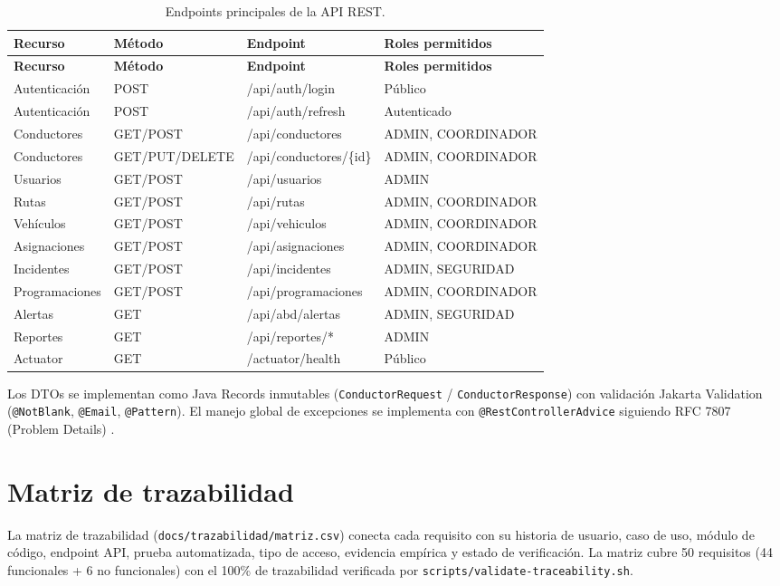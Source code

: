\begin{longtable}{@{}p{3.5cm}p{2cm}p{2.5cm}p{2.5cm}@{}}
\caption{Endpoints principales de la API REST.}
\label{tab:api-rest}\\
\toprule
\textbf{Recurso} & \textbf{Método} & \textbf{Endpoint} & \textbf{Roles permitidos} \\
\midrule
\endfirsthead
\toprule
\textbf{Recurso} & \textbf{Método} & \textbf{Endpoint} & \textbf{Roles permitidos} \\
\midrule
\endhead
Autenticación & POST & /api/auth/login & Público \\
Autenticación & POST & /api/auth/refresh & Autenticado \\
Conductores & GET/POST & /api/conductores & ADMIN, COORDINADOR \\
Conductores & GET/PUT/DELETE & /api/conductores/\{id\} & ADMIN, COORDINADOR \\
Usuarios & GET/POST & /api/usuarios & ADMIN \\
Rutas & GET/POST & /api/rutas & ADMIN, COORDINADOR \\
Vehículos & GET/POST & /api/vehiculos & ADMIN, COORDINADOR \\
Asignaciones & GET/POST & /api/asignaciones & ADMIN, COORDINADOR \\
Incidentes & GET/POST & /api/incidentes & ADMIN, SEGURIDAD \\
Programaciones & GET/POST & /api/programaciones & ADMIN, COORDINADOR \\
Alertas & GET & /api/abd/alertas & ADMIN, SEGURIDAD \\
Reportes & GET & /api/reportes/* & ADMIN \\
Actuator & GET & /actuator/health & Público \\
\bottomrule
\end{longtable}

Los DTOs se implementan como Java Records inmutables (\texttt{ConductorRequest} / \texttt{ConductorResponse}) con validación Jakarta Validation (\texttt{@NotBlank}, \texttt{@Email}, \texttt{@Pattern}). El manejo global de excepciones se implementa con \texttt{@RestControllerAdvice} siguiendo RFC 7807 (Problem Details) \cite{rfc7807}.

\section{Matriz de trazabilidad}
\label{sec:matriz-trazabilidad}

La matriz de trazabilidad (\texttt{docs/trazabilidad/matriz.csv}) conecta cada requisito con su historia de usuario, caso de uso, módulo de código, endpoint API, prueba automatizada, tipo de acceso, evidencia empírica y estado de verificación. La matriz cubre 50 requisitos (44 funcionales + 6 no funcionales) con el 100\% de trazabilidad verificada por \texttt{scripts/validate-traceability.sh}.

